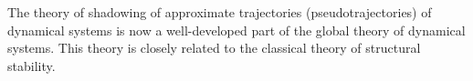 The theory of shadowing of approximate trajectories (pseudotrajectories)
of dynamical systems is now a well-developed part of the global theory of
dynamical systems.
This theory is closely related to the classical theory of structural stability.
